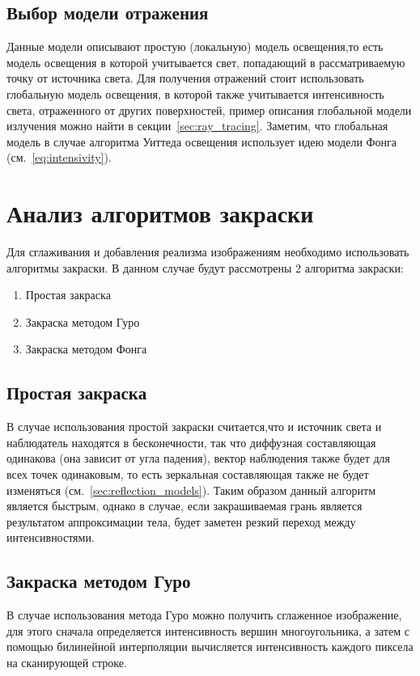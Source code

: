 \documentclass[a4paper,14pt,unknownkeysallowed]{extreport}
\begin{document}
\subsection{Выбор модели отражения}
Данные модели описывают простую (локальную) модель освещения,то есть модель освещения в которой учитывается свет, попадающий в рассматриваемую точку от источника света.
Для получения отражений стоит использовать глобальную модель освещения, в которой также учитывается интенсивность света, отраженного от других поверхностей, пример описания глобальной модели излучения можно найти в секции~\ref{sec:ray_tracing}.
Заметим, что глобальная модель в случае алгоритма Уиттеда освещения использует идею модели Фонга (см.~\ref{eq:intensivity}).


\section{Анализ алгоритмов закраски}
Для сглаживания и добавления реализма изображениям  необходимо использовать алгоритмы закраски.
В данном случае будут рассмотрены 2 алгоритма закраски:
\begin{enumerate}
	\item Простая закраска
	\item Закраска методом Гуро
	\item Закраска методом Фонга
\end{enumerate}

\subsection{Простая закраска}
В случае использования простой закраски считается,что и источник света и наблюдатель находятся в бесконечности,
так что диффузная составляющая одинакова (она зависит от угла падения), вектор наблюдения также будет для всех точек одинаковым, то есть зеркальная составляющая
также не будет изменяться (см.~\ref{sec:reflection_models}). 
Таким образом данный алгоритм является быстрым, однако в случае, если закрашиваемая грань является результатом аппроксимации тела, 
будет заметен резкий переход между интенсивностями. \cite{Rodgers}


\subsection{Закраска методом Гуро}
В случае использования метода Гуро можно получить сглаженное изображение, для этого сначала определяется интенсивность вершин многоугольника, а
затем с помощью билинейной интерполяции вычисляется интенсивность каждого пиксела на сканирующей строке.
\end{document}
